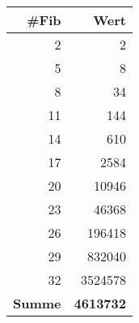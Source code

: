 \begin{table}[ht]
\centering
%
\label{tab:IsingModel}
%
\begin{tabularx}{0.3\textwidth}{r r}
\hline
\rowcolor{tableheadcolor}
\textbf{\#Fib} & \textbf{Wert} \\
\hline
2 & 2 \\
5 & 8 \\
8 & 34 \\
11 & \num{144} \\
14 & \num{610} \\
17 & \num{2584} \\
20 & \num{10946} \\
23 & \num{46368} \\
26 & \num{196418} \\
29 & \num{832040} \\
32 & \num{3524578} \\
\hline
\textbf{Summe} & \textbf{\num{4613732}}\\
\hline
\end{tabularx}
\end{table}